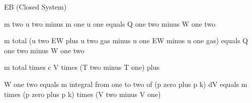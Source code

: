 EB (Closed System)  

m two u two minus m one u one equals Q one two minus W one two  

m total (u two EW plus u two gas minus u one EW minus u one gas) equals Q one two minus W one two  

m total times c V times (T two minus T one) plus  

W one two equals m integral from one to two of (p zero plus p k) dV equals m times (p zero plus p k) times (V two minus V one)